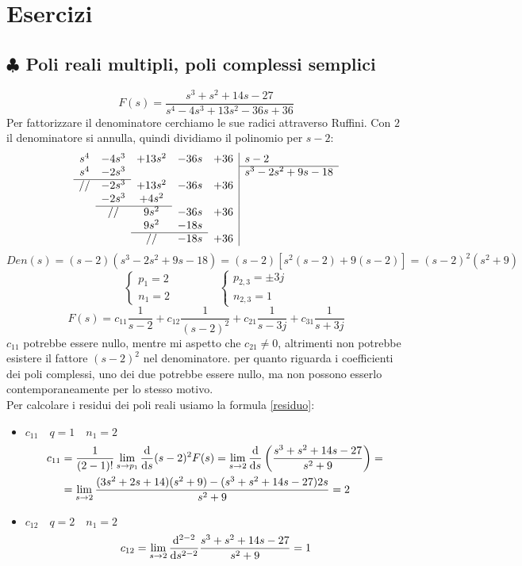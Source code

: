 \section{Esercizi}
\subsection{$ \clubsuit $ Poli reali multipli, poli complessi semplici}
\[ F(s) = \frac{s^3+s^2+14s-27}{s^4-4s^3+13s^2-36s+36} \]
Per fattorizzare il denominatore cerchiamo le sue radici attraverso Ruffini. Con $ 2 $ il denominatore si annulla, quindi dividiamo il polinomio per $ s-2 $:
\[ 
\begin{array}{ccccc|l}
	s^4 & -4s^3 & +13s^2 & -36s & +36 & s-2  \\ \cline{6-6}
	s^4 & -2s^3 &        &      &     & s^3-2s^2+9s-18  \\ \cline{1-2}
	//  & -2s^3 & +13s^2 & -36s & +36 &   \\ 
		& -2s^3 & +4s^2  &      &     &   \\ \cline{2-3} 
		& //    & 9s^2   & -36s & +36 &   \\ 
		& 	    & 9s^2   & -18s &     &   \\ \cline{3-4}
		&       & //     & -18s & +36 &   
\end{array}  
\]
\smallskip
\[ Den(s) = (s-2)(s^3-2s^2+9s-18) = (s-2)[s^2(s-2) + 9(s-2)] = (s-2)^2 (s^2+9) \]
\[ \begin{cases}p_1 = 2\\ n_1=2\end{cases} \qquad \qquad
   \begin{cases}p_{2,3}=\pm 3j\\ n_{2,3}=1\end{cases}
\]
\[ F(s) = c_{11} \frac{1}{s-2} + c_{12} \frac{1}{(s-2)^2} + c_{21} \frac{1}{s-3j} + c_{31} \frac{1}{s+3j} \]
\smallskip
$ c_{11} $ potrebbe essere nullo, mentre mi aspetto che $ c_{21} \neq 0 $, altrimenti non potrebbe esistere il fattore $ (s-2)^2 $ nel denominatore. per quanto riguarda i coefficienti dei poli complessi, uno dei due potrebbe essere nullo, ma non possono esserlo contemporaneamente per lo stesso motivo.\\ 
\smallskip
Per calcolare i residui dei poli reali usiamo la formula \ref{residuo}:
\begin{itemize}
	\item $ c_{11} \quad q=1 \quad n_1=2 $
	\begin{align*}
		c_{11} &= \frac{1}{(2-1)!} \lim\limits_{s \rightarrow p_1} \frac{\mathrm{d} }{\mathrm{d} s} (s-2)^2 F(s) = \lim\limits_{s \rightarrow 2} \frac{\mathrm{d} }{\mathrm{d} s} \left( \frac{s^3+s^2+14s-27}{s^2+9} \right) =\\
		&= \lim\limits_{s \rightarrow 2} \frac{(3s^2+2s+14)(s^2+9)-(s^3+s^2+14s-27)2s}{s^2+9} = 2
	\end{align*}
	\item $ c_{12} \quad q=2 \quad n_1=2 $
	\[ c_{12} = \lim\limits_{s \rightarrow 2} \frac{\mathrm{d} ^{2-2}}{\mathrm{d} s^{2-2}} \frac{s^3+s^2+14s-27}{s^2+9} = 1 \]
\end{itemize}
